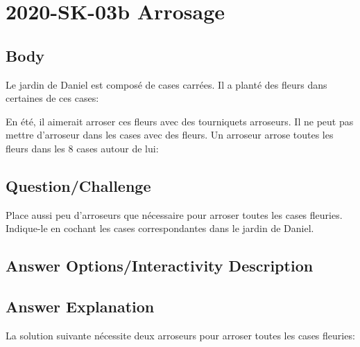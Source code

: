 \documentclass[a4paper,11pt]{report}
\newcommand{\taskGraphicsFolder}{..}
\begin{document}
\section*{\centering{} 2020-SK-03b Arrosage}


\subsection*{Body}

Le jardin de Daniel est composé de cases carrées. Il a planté des fleurs dans certaines de ces cases:

{\centering%
\par}

En été, il aimerait arroser ces fleurs avec des tourniquets arroseurs. Il ne peut pas mettre d’arroseur dans les cases avec des fleurs. Un arroseur arrose toutes les fleurs dans les $8$ cases autour de lui:

{\centering%
\par}

{\em

\subsection*{Question/Challenge}

Place aussi peu d’arroseurs que nécessaire pour arroser toutes les cases fleuries. Indique-le en cochant les cases correspondantes dans le jardin de Daniel.

}\begingroup
\renewcommand{\arraystretch}{1.5}
\subsection*{Answer Options/Interactivity Description}



\endgroup

\subsection*{Answer Explanation}

La solution suivante nécessite deux arroseurs pour arroser toutes les cases fleuries:

{\centering%
\par}
\end{document}

